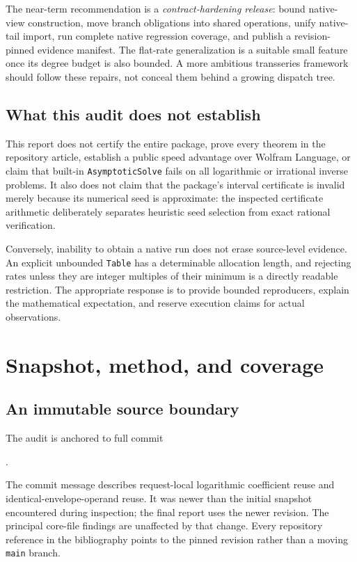 The near-term recommendation is a \emph{contract-hardening release}: bound native-view construction, move branch obligations into shared operations, unify native-tail import, run complete native regression coverage, and publish a revision-pinned evidence manifest. The flat-rate generalization is a suitable small feature once its degree budget is also bounded. A more ambitious transseries framework should follow these repairs, not conceal them behind a growing dispatch tree.

\subsection{What this audit does not establish}

This report does not certify the entire package, prove every theorem in the repository article, establish a public speed advantage over Wolfram Language, or claim that built-in \texttt{AsymptoticSolve} fails on all logarithmic or irrational inverse problems. It also does not claim that the package's interval certificate is invalid merely because its numerical seed is approximate: the inspected certificate arithmetic deliberately separates heuristic seed selection from exact rational verification.\cite{certificates}

Conversely, inability to obtain a native run does not erase source-level evidence. An explicit unbounded \texttt{Table} has a determinable allocation length, and rejecting rates unless they are integer multiples of their minimum is a directly readable restriction. The appropriate response is to provide bounded reproducers, explain the mathematical expectation, and reserve execution claims for actual observations.

\section{Snapshot, method, and coverage}
\label{sec:method}

\subsection{An immutable source boundary}

The audit is anchored to full commit
\begin{center}.\end{center}
The commit message describes request-local logarithmic coefficient reuse and identical-envelope-operand reuse. It was newer than the initial snapshot encountered during inspection; the final report uses the newer revision. The principal core-file findings are unaffected by that change. Every repository reference in the bibliography points to the pinned revision rather than a moving \texttt{main} branch.\cite{commit,core}

